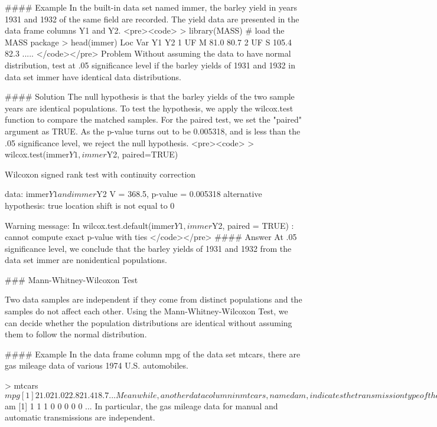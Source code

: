 #### Example
In the built-in data set named immer, the barley yield in years 1931 and 1932 of the same field are recorded. The yield data are presented in the data frame columns Y1 and Y2.
<pre><code>
> library(MASS)         # load the MASS package 
> head(immer) 
  Loc Var    Y1    Y2 
1  UF   M  81.0  80.7 
2  UF   S 105.4  82.3 
    .....
</code></pre>    
Problem
Without assuming the data to have normal distribution, test at .05 significance level if the barley yields of 1931 and 1932 in data set immer have identical data distributions.

#### Solution
The null hypothesis is that the barley yields of the two sample years are identical populations. To test the hypothesis, we apply the wilcox.test function to compare the matched samples. For the paired test, we set the "paired" argument as TRUE. As the p-value turns out to be 0.005318, and is less than the .05 significance level, we reject the null hypothesis.
<pre><code>
> wilcox.test(immer$Y1, immer$Y2, paired=TRUE) 
 
        Wilcoxon signed rank test with continuity correction 
 
data:  immer$Y1 and immer$Y2 
V = 368.5, p-value = 0.005318 
alternative hypothesis: true location shift is not equal to 0 
 
Warning message: 
In wilcox.test.default(immer$Y1, immer$Y2, paired = TRUE) : 
  cannot compute exact p-value with ties
</code></pre>     
#### Answer
At .05 significance level, we conclude that the barley yields of 1931 and 1932 from the data set immer are nonidentical populations.

### Mann-Whitney-Wilcoxon Test

Two data samples are independent if they come from distinct populations and the samples do not affect each other. Using the Mann-Whitney-Wilcoxon Test, we can decide whether the population distributions are identical without assuming them to follow the normal distribution.

#### Example
In the data frame column mpg of the data set mtcars, there are gas mileage data of various 1974 U.S. automobiles.

> mtcars$mpg 
 [1] 21.0 21.0 22.8 21.4 18.7 ...
Meanwhile, another data column in mtcars, named am, indicates the transmission type of the automobile model (0 = automatic, 1 = manual). In other words, it is the differentiating factor of the transmission type.

> mtcars$am 
 [1] 1 1 1 0 0 0 0 0 ...
In particular, the gas mileage data for manual and automatic transmissions are independent.

